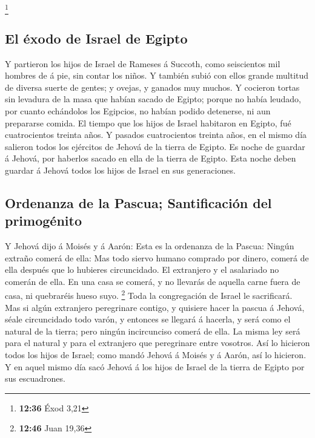 \footnote{\textbf{12:36} Éxod 3,21}

\hypertarget{el-uxe9xodo-de-israel-de-egipto}{%
\subsection{El éxodo de Israel de
Egipto}\label{el-uxe9xodo-de-israel-de-egipto}}

 Y partieron los hijos de Israel de Rameses á Succoth, como
seiscientos mil hombres de á pie, sin contar los niños.  Y
también subió con ellos grande multitud de diversa suerte de gentes; y
ovejas, y ganados muy muchos.  Y cocieron tortas sin
levadura de la masa que habían sacado de Egipto; porque no había
leudado, por cuanto echándolos los Egipcios, no habían podido detenerse,
ni aun prepararse comida.  El tiempo que los hijos de
Israel habitaron en Egipto, fué cuatrocientos treinta años.
 Y pasados cuatrocientos treinta años, en el mismo día
salieron todos los ejércitos de Jehová de la tierra de Egipto.
 Es noche de guardar á Jehová, por haberlos sacado en ella
de la tierra de Egipto. Esta noche deben guardar á Jehová todos los
hijos de Israel en sus generaciones.

\hypertarget{ordenanza-de-la-pascua-santificaciuxf3n-del-primoguxe9nito}{%
\subsection{Ordenanza de la Pascua; Santificación del
primogénito}\label{ordenanza-de-la-pascua-santificaciuxf3n-del-primoguxe9nito}}

 Y Jehová dijo á Moisés y á Aarón: Esta es la ordenanza de
la Pascua: Ningún extraño comerá de ella:  Mas todo siervo
humano comprado por dinero, comerá de ella después que lo hubieres
circuncidado.  El extranjero y el asalariado no comerán de
ella.  En una casa se comerá, y no llevarás de aquella
carne fuera de casa, ni quebraréis hueso suyo. \footnote{\textbf{12:46}
  Juan 19,36}  Toda la congregación de Israel le
sacrificará.  Mas si algún extranjero peregrinare contigo,
y quisiere hacer la pascua á Jehová, séale circuncidado todo varón, y
entonces se llegará á hacerla, y será como el natural de la tierra; pero
ningún incircunciso comerá de ella.  La misma ley será para
el natural y para el extranjero que peregrinare entre vosotros.
 Así lo hicieron todos los hijos de Israel; como mandó
Jehová á Moisés y á Aarón, así lo hicieron.  Y en aquel
mismo día sacó Jehová á los hijos de Israel de la tierra de Egipto por
sus escuadrones.

